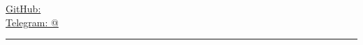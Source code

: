 \begin{center}
	\HeaderRect
	\begin{minipage}[b]{.3\textwidth}
	\raggedright
	{\city} \\ %
	\href{mailto:\email}{\email} %
	\end{minipage}%
	\begin{minipage}[b]{.4\textwidth}
	\makeatletter
	\centering {\Huge \@author} \\
	\makeatother
    \vspace{.5em}
    {\color{highlight} \Large{\role}}
	\end{minipage}%
	\begin{minipage}[b]{.3\textwidth}
	\raggedleft 
	\href{https://github.com/\github}{GitHub: \github} \\%
	\href{https://t.me/\LinkedIn}{Telegram: @\LinkedIn} 
	\end{minipage}

{\color{highlight} \hrule}
\end{center}